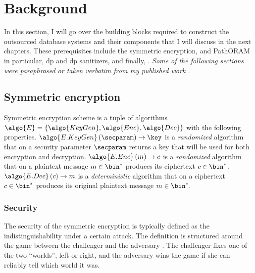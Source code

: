 \chapter{Background}\label{section:background}
\thispagestyle{myheadings}

	In this section, I will go over the building blocks required to construct the outsourced database systems and their components that I will discuss in the next chapters.
	These prerequisites include the symmetric encryption,  and PathORAM \cite{path-oram} in particular, \acrlong{dp} and \acrshort{dp} sanitizers, and finally, .
	\emph{Some of the following sections were paraphrased or taken verbatim from my published work \cite{ore-benchmark-17,epsolute}.}

	\section{Symmetric encryption}\label{section:background:encryption}

		Symmetric encryption scheme is a tuple of algorithms $\algo{E} = \{ \algo{KeyGen}, \algo{Enc}, \algo{Dec} \}$ with the following properties.
		$\algo{E.KeyGen} \left( \secparam \right) \to \key$ is a \emph{randomized} algorithm that on a security parameter $\secparam$ returns a key that will be used for both encryption and decryption.
		$\algo{E.Enc} \left( m \right) \to c$ is a \emph{randomized} algorithm that on a plaintext message $m \in \bin^*$ produces its ciphertext $c \in \bin^*$.
		$\algo{E.Dec} \left( c \right) \to m$ is a \emph{deterministic} algorithm that on a ciphertext $c \in \bin^*$ produces its original plaintext message $m \in \bin^*$.

		\subsection{Security}

			The security of the symmetric encryption is typically defined as the indistinguishability under a certain attack.
			The definition is structured around the game between the challenger and the adversary \adversary{}.
			The challenger fixes one of the two ``worlds'', left or right, and the adversary wins the game if she can reliably tell which world it was.

